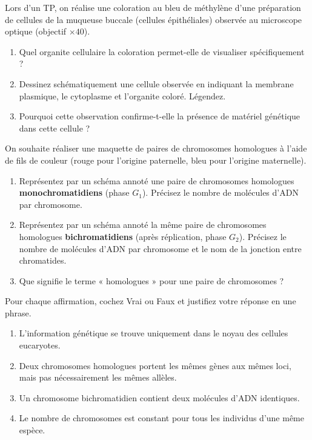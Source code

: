 \documentclass[11pt]{article}
\begin{document}
\begin{exercice}
Lors d'un TP, on réalise une coloration au bleu de méthylène d'une préparation de cellules de la muqueuse buccale (cellules épithéliales) observée au microscope optique (objectif $\times 40$).
\begin{enumerate}
    \item Quel organite cellulaire la coloration permet-elle de visualiser spécifiquement ?
    \item Dessinez schématiquement une cellule observée en indiquant la membrane plasmique, le cytoplasme et l'organite coloré. Légendez.
    \item Pourquoi cette observation confirme-t-elle la présence de matériel génétique dans cette cellule ?
\end{enumerate}
\end{exercice}

\begin{exercice}
On souhaite réaliser une maquette de paires de chromosomes homologues à l'aide de fils de couleur (rouge pour l'origine paternelle, bleu pour l'origine maternelle).
\begin{enumerate}
    \item Représentez par un schéma annoté une paire de chromosomes homologues \textbf{monochromatidiens} (phase $G_1$). Précisez le nombre de molécules d'ADN par chromosome.
    \item Représentez par un schéma annoté la même paire de chromosomes homologues \textbf{bichromatidiens} (après réplication, phase $G_2$). Précisez le nombre de molécules d'ADN par chromosome et le nom de la jonction entre chromatides.
    \item Que signifie le terme « homologues » pour une paire de chromosomes ?
\end{enumerate}
\end{exercice}

\begin{exercice}
Pour chaque affirmation, cochez Vrai ou Faux et justifiez votre réponse en une phrase.
\begin{enumerate}
    \item L'information génétique se trouve uniquement dans le noyau des cellules eucaryotes.
    \item Deux chromosomes homologues portent les mêmes gènes aux mêmes loci, mais pas nécessairement les mêmes allèles.
    \item Un chromosome bichromatidien contient deux molécules d'ADN identiques.
    \item Le nombre de chromosomes est constant pour tous les individus d'une même espèce.
\end{enumerate}
\end{exercice}
\end{document}
